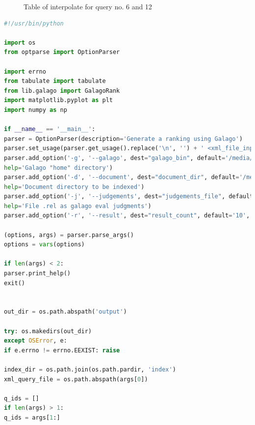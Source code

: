\documentclass[letterpaper,11pt]{article}
\begin{document}
\begin{figure}[H]
	\centering
	\caption{Table of interpolate for query no. 6 and 12}
	\label{fig:84_query6_12_table}
\end{figure}



\begin{lstlisting}[language=python, caption={Code for question 8.4}, label={lst:84}]
#!/usr/bin/python

import os
from optparse import OptionParser

import errno
from tabulate import tabulate
from lib.galago import GalagoRank
import matplotlib.pyplot as plt
import numpy as np

if __name__ == '__main__':
parser = OptionParser(description='Generate a ranking using Galago')
parser.set_usage(parser.get_usage().replace('\n', '') + ' <xml_file_input> [q1 ... qn]')
parser.add_option('-g', '--galago', dest="galago_bin", default='/media/erikaris/DATA/ODU/Semester_3/intro_to_info_retrieval/galago/galago-3.10-bin/bin/galago',
help='Galago "home" directory')
parser.add_option('-d', '--document', dest="document_dir", default='/media/erikaris/DATA/ODU/Semester_3/intro_to_info_retrieval/assignments/a4/code-report/cac',
help='Document directory to be indexed')
parser.add_option('-j', '--judgements', dest="judgements_file", default='/media/erikaris/DATA/ODU/Semester_3/intro_to_info_retrieval/assignments/a4/code-report/cacm.rel',
help='File .rel as galago eval judgments')
parser.add_option('-r', '--result', dest="result_count", default='10', help='Number of result')

(options, args) = parser.parse_args()
options = vars(options)

if len(args) < 2:
parser.print_help()
exit()


out_dir = os.path.abspath('output')

try: os.makedirs(out_dir)
except OSError, e:
if e.errno != errno.EEXIST: raise

index_dir = os.path.join(os.path.pardir, 'index')
xml_query_file = os.path.abspath(args[0])

q_ids = []
if len(args) > 1:
q_ids = args[1:]


\end{lstlisting}
\end{document}
